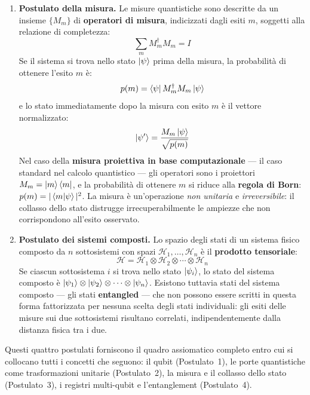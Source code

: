 \begin{onehalfspace}
\begin{enumerate}
    \item \textbf{Postulato della misura.} Le misure quantistiche sono descritte da un insieme $\{M_m\}$ di \textbf{operatori di misura}, indicizzati dagli esiti $m$, soggetti alla relazione di completezza:
    \begin{equation}
        \sum_m M_m^\dagger M_m = I
    \end{equation}
    Se il sistema si trova nello stato $\ket{\psi}$ prima della misura, la probabilità di ottenere l'esito $m$ è:
    \begin{equation}
        p(m) = \bra{\psi} M_m^\dagger M_m \ket{\psi}
    \end{equation}
    e lo stato immediatamente dopo la misura con esito $m$ è il vettore normalizzato:
    \begin{equation}
        \ket{\psi'} = \frac{M_m\ket{\psi}}{\sqrt{p(m)}}
    \end{equation}
    Nel caso della \textbf{misura proiettiva in base computazionale} --- il caso standard nel calcolo quantistico --- gli operatori sono i proiettori $M_m = \ket{m}\bra{m}$, e la probabilità di ottenere $m$ si riduce alla \textbf{regola di Born}: $p(m) = |\braket{m|\psi}|^2$. La misura è un'operazione \textit{non unitaria} e \textit{irreversibile}: il collasso dello stato distrugge irrecuperabilmente le ampiezze che non corrispondono all'esito osservato.

    \item \textbf{Postulato dei sistemi composti.} Lo spazio degli stati di un sistema fisico composto da $n$ sottosistemi con spazi $\mathcal{H}_1, \ldots, \mathcal{H}_n$ è il \textbf{prodotto tensoriale}:
    \begin{equation}
        \mathcal{H} = \mathcal{H}_1 \otimes \mathcal{H}_2 \otimes \cdots \otimes \mathcal{H}_n
    \end{equation}
    Se ciascun sottosistema $i$ si trova nello stato $\ket{\psi_i}$, lo stato del sistema composto è $\ket{\psi_1} \otimes \ket{\psi_2} \otimes \cdots \otimes \ket{\psi_n}$. Esistono tuttavia stati del sistema composto --- gli stati \textbf{entangled} --- che non possono essere scritti in questa forma fattorizzata per nessuna scelta degli stati individuali: gli esiti delle misure sui due sottosistemi risultano correlati, indipendentemente dalla distanza fisica tra i due.
\end{enumerate}

Questi quattro postulati forniscono il quadro assiomatico completo entro cui si collocano tutti i concetti che seguono: il qubit (Postulato~1), le porte quantistiche come trasformazioni unitarie (Postulato~2), la misura e il collasso dello stato (Postulato~3), i registri multi-qubit e l'entanglement (Postulato~4).


\end{onehalfspace}
